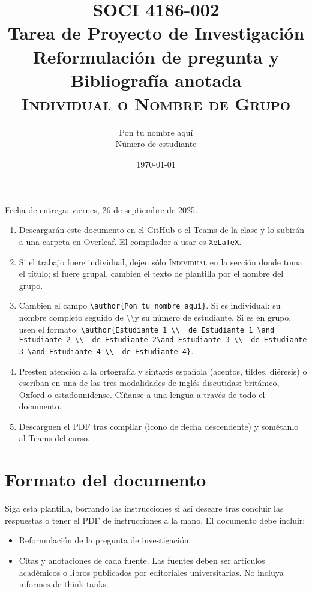 \documentclass[11pt]{article}
\title{SOCI 4186-002\\ Tarea de Proyecto de Investigación \textnumero 2 \\ Reformulación de pregunta y Bibliografía anotada \\ \textsc{Individual o Nombre de Grupo}}
\author{Pon tu nombre aquí \\ Número de estudiante}
\date{\today} %
\begin{document}
\singlespacing
\maketitle
Fecha de entrega: viernes, 26 de septiembre de 2025.

\begin{enumerate}
    \item Descargarán este documento en el GitHub o el Teams de la clase y lo subirán a una carpeta en Overleaf. El compilador a usar es \texttt{XeLaTeX}.
    \item Si el trabajo fuere individual, dejen sólo \textsc{Individual} en la sección donde toma el título; si fuere grupal, cambien el texto de plantilla por el nombre del grupo.
    \item Cambien el campo \texttt{\textbackslash author\{Pon tu nombre aquí\}}. Si es individual: su nombre completo seguido de \textbackslash\textbackslash y su número de estudiante. Si es en grupo, usen el formato: \texttt{\textbackslash author\{Estudiante 1 \textbackslash\textbackslash \ \textnumero\ de Estudiante 1 \textbackslash and Estudiante 2 \textbackslash\textbackslash \ \textnumero\ de Estudiante 2\textbackslash and Estudiante 3 \textbackslash\textbackslash \ \textnumero\ de Estudiante 3 \textbackslash and Estudiante 4 \textbackslash\textbackslash\ \textnumero\ de Estudiante 4\}}.
    \item Presten atención a la ortografía y sintaxis española (acentos, tildes, diéresis) o escriban en una de las tres modalidades de inglés discutidas: británico, Oxford o estadounidense. Cíñanse a una lengua a través de todo el documento.
    \item Descarguen el PDF tras compilar (icono de flecha descendente) y sométanlo al Teams del curso.
\end{enumerate}

\section*{Formato del documento}
Siga esta plantilla, borrando las instrucciones si así deseare tras concluir las respuestas o tener el PDF de instrucciones a la mano. El documento debe incluir:
\begin{itemize}
    \item Reformulación de la pregunta de investigación.
    \item Citas y anotaciones de cada fuente. Las fuentes deben ser artículos académicos o libros publicados por editoriales universitarias. No incluya informes de think tanks.
\end{itemize}
\onehalfspacing
\end{document}
